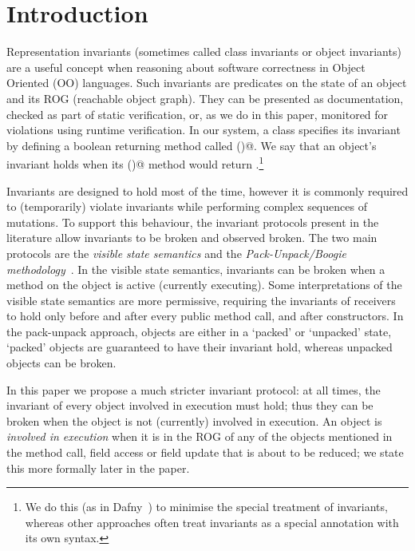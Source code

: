 \section{Introduction}
\label{s:intro}
Representation invariants (sometimes called class invariants or object invariants) are
a useful concept when reasoning about software correctness in Object Oriented (OO) languages. Such invariants are predicates on the state of an object and its ROG (reachable object graph).
They can be presented as documentation, checked as part of static verification, or, as we do in this paper, monitored for violations using runtime verification.
In our system, a class specifies its invariant by defining a boolean returning method called \Q@invariant()@.
We say that an object's invariant holds when its \Q@invariant()@ method would return \Q@true@.\footnote{We do this (as in Dafny~\cite{DBLP:conf/sigada/Leino12}) to minimise the special treatment of invariants, whereas other approaches often treat invariants as a special annotation with its own syntax.}

Invariants are designed to hold most of the time, however it is commonly required to (temporarily) violate invariants while performing complex sequences of mutations.
To support this behaviour, the invariant protocols present in the literature allow invariants to be broken and observed broken.
The two main protocols are the \emph{visible state semantics} \cite{Meyer:1988:OSC:534929} and the \emph{Pack-Unpack/Boogie methodology}~\cite{DBLP:journals/jot/BarnettDFLS04}.
In the visible state semantics, invariants can be broken when a method on the object is active (currently executing).
Some interpretations of the visible state semantics are more permissive, requiring the invariants of receivers to hold only before and after every public method call, and after constructors. 
In the pack-unpack approach, objects are either in a `packed' or `unpacked' state, 
`packed' objects are guaranteed to have their invariant hold, whereas unpacked objects can be broken.

In this paper we propose a much stricter invariant protocol: at all times, the invariant of every object involved in execution must hold; thus they can be broken when the object is not (currently) involved in execution. 
An object is \emph{involved in execution} when it is in the ROG of any of the objects mentioned in the method call, field access or field update that is about to be reduced; we state this more formally later in the paper.

